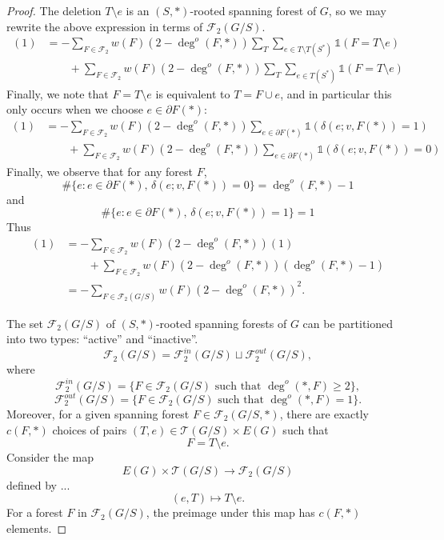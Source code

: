 \documentclass{amsart}
\theoremstyle{definition}
\newcommand{\one}{\mathds{1}}
\newcommand{\trees}{\mathcal{T}}
\newcommand{\forests}{\mathcal{F}}
\begin{document}
\begin{proof}
The deletion $T \setminus e$ is an $(S,*)$-rooted spanning forest of $G$,
so we may rewrite the above expression in terms of $\forests_2(G/S)$.
\begin{align*}
(1) &= - \sum_{F \in \forests_2} w(F) (2 - \deg^o(F,*)) \sum_{T} \sum_{e \in T\setminus T(S^*)} \one(F = T \setminus e)  \\
&\qquad +  \sum_{F \in \forests_2} w(F) (2 - \deg^o(F,*)) \sum_{T} \sum_{e \in T(S^*)} \one(F = T \setminus e) 
\end{align*}
Finally, we note that $F = T \setminus e$ is equivalent to $T = F \cup e$, and in particular this only occurs when we choose $e \in \partial F(*)$:
\begin{align*}
(1) &= - \sum_{F \in \forests_2} w(F) (2 - \deg^o(F,*))  \sum_{e \in \partial F(*)} \one( \delta(e; v, F(*)) = 1)  \\
&\qquad +  \sum_{F \in \forests_2} w(F) (2 - \deg^o(F,*)) \sum_{e\in \partial F(*)} \one(\delta(e; v, F(*))=0) 
\end{align*}
Finally, we observe that for any forest $F$,
$$
\#\{e : e \in \partial F(*), \,\delta(e;v, F(*)) = 0 \} = \deg^o(F,*) - 1
$$
and
$$
\#\{e : e \in \partial F(*), \,\delta(e;v, F(*)) = 1 \} = 1
$$
Thus
\begin{align*}
(1) 
&= - \sum_{F \in \forests_2} w(F) (2 - \deg^o(F,*))  (1)  \\
&\qquad +  \sum_{F \in \forests_2} w(F) (2 - \deg^o(F,*)) (\deg^o(F,*) - 1) \\
&= - \!\!\!\sum_{F \in \forests_2(G/S)} w(F) (2 - \deg^o(F,*))^2 .
\end{align*}

The set $\forests_2(G/S)$ of $(S,*)$-rooted spanning forests of $G$ can be partitioned into two types: ``active'' and ``inactive''.
$$
\forests_2(G/S) = \forests_2^{in}(G/S) \sqcup \forests_2^{out}(G/S),
$$
where
$$
\forests_2^{in}(G/S)  = \{ F \in \forests_2(G/S) \text{ such that } \deg^o(*,F) \geq 2\},
$$
$$
\forests_2^{out}(G/S)  = \{ F \in \forests_2(G/S) \text{ such that } \deg^o(*,F) = 1\}.
$$
Moreover, for a given spanning forest
$F \in \forests_2(G/S, *)$,
there are exactly $c(F, *)$ choices of pairs $(T,e) \in \trees(G/S) \times E(G)$ such that
$$
F = T \setminus e.
$$
Consider the map
$$
E(G) \times \trees(G/S) \to \forests_2(G/S)
$$
defined by ...
$$
(e, T) \mapsto T \setminus e .
$$
For a forest $F$ in $\forests_2(G/S)$,
the preimage under this map has $c(F,*)$ elements.



\end{proof}
\end{document}
